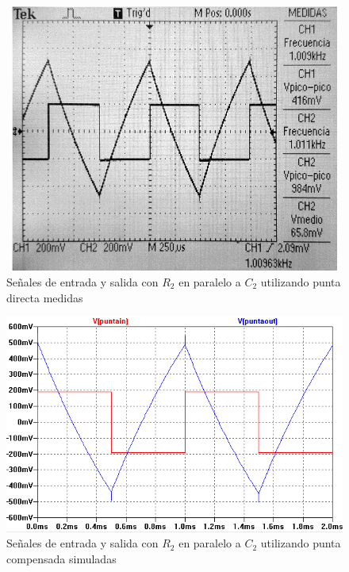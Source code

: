\documentclass[10pt,spanish,a4paper,openany,notitlepage]{article}
\begin{document}
\begin{figure}[H]
\centering
\includegraphics[width=350pt, height=250pt]{mediciones/B-X1-CC-10K.jpg}
\caption{Señales de entrada y salida con $R_2$ en paralelo a $C_2$ utilizando punta directa medidas}
\label{fig:int_x1_R_med}
\end{figure}

\begin{figure}[H]
\centering
\includegraphics[scale=0.8]{simulaciones/BconR2puntax10.png}
\caption{Señales de entrada y salida con $R_2$ en paralelo a $C_2$ utilizando punta compensada simuladas}
\label{fig:int_x10_R}
\end{figure}
\end{document}
